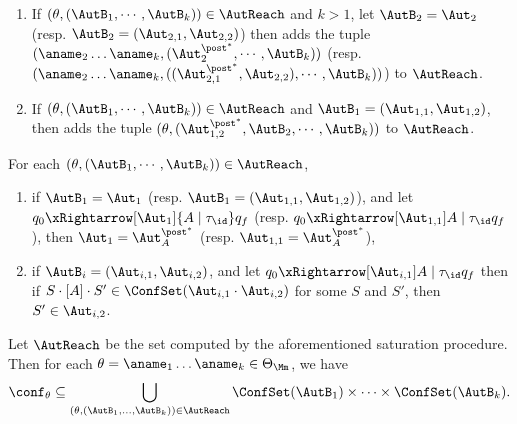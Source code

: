 {\begin{minipage}{0.95\textwidth}
\begin{enumerate}
\begin{itemize}
                adding the transitions $(q_0,A,\tau'\circ\tau,q)$ for each $q_0\xRightarrow[\Aut_{A_0'}^{\post^*}]{\epsilon | \tau'} q_f$ and $q_0\xRightarrow[\Aut_1]{A | \tau} q$.
        \end{itemize}
    \item If $(\theta, (\AutB_1,\cdots,\AutB_k)) \in \AutReach$ and $k>1$, let $\AutB_2 = \Aut_2$ (resp. $\AutB_2 = (\Aut_{2,1},\Aut_{2,2})$) then adds the tuple $(\aname_2\dots\aname_k, (\Aut_2^{\post^*},\cdots,\AutB_k))$ (resp. $(\aname_2\dots\aname_k, ((\Aut_{2,1}^{\post^*},\Aut_{2,2}),\cdots,\AutB_k))$) to $\AutReach$.
    \item If $(\theta, (\AutB_1,\cdots,\AutB_k)) \in \AutReach$ and $\AutB_1=(\Aut_{1,1},\Aut_{1,2})$, then adds the tuple $(\theta, (\Aut_{1,2}^{\post^*},\AutB_2,\cdots,\AutB_k))$ to $\AutReach$.
\end{enumerate}
\end{minipage}
}
\smallskip

\begin{proposition}\label{prop:sat}
    For each $(\theta,(\AutB_1,\cdots,\AutB_k))\in\AutReach$,
    \begin{enumerate}
        \item if $\AutB_1 = \Aut_1$ (resp. $\AutB_1=(\Aut_{1,1},\Aut_{1,2})$), and let $q_0\xRightarrow[\Aut_1]{A\mid\tau_{\id}}q_f$ (resp. $q_0\xRightarrow[\Aut_{1,1}]{A\mid\tau_{\id}}q_f$),
            then $\Aut_1 = \Aut_{A}^{\post^*}$ (resp. $\Aut_{1,1} = \Aut_{A}^{\post^*}$), 
        \item if $\AutB_i = (\Aut_{i,1},\Aut_{i,2})$, and let $q_0\xRightarrow[\Aut_{i,1}]{A\mid\tau_{\id}}q_f$ then
            if $S\cdot[A]\cdot S'\in\ConfSet(\Aut_{i,1}\cdot\Aut_{i,2})$ for some $S$ and $S'$, then $S'\in\Aut_{i,2}$.
    \end{enumerate}
\end{proposition}

\begin{lemma}\label{lem:a0nostk}
    Let $\AutReach$ be the set computed by the aforementioned saturation procedure. Then for each $\theta=\aname_1\dots\aname_k\in\Theta_{\Mm}$, we have
    $$\conf_{\theta}\subseteq\bigcup \limits_{(\theta, (\AutB_1, \dots, \AutB_k)) \in \AutReach} \ConfSet(\AutB_1) \times \dots \times \ConfSet(\AutB_k).$$
\end{lemma}

